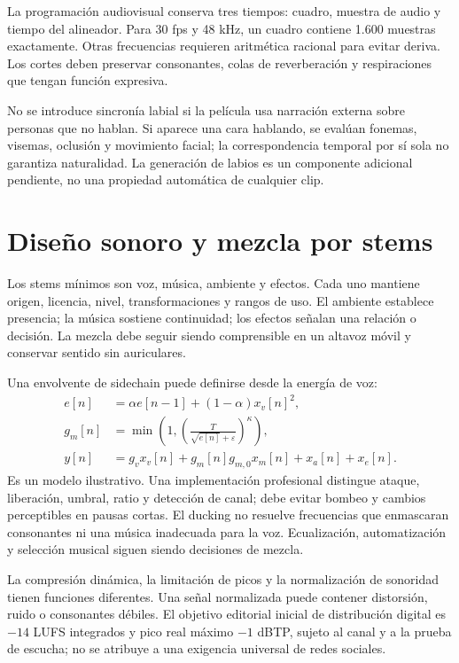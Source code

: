 La programación audiovisual conserva tres tiempos: cuadro, muestra de audio y tiempo del alineador. Para 30 fps y 48 kHz, un cuadro contiene 1.600 muestras exactamente. Otras frecuencias requieren aritmética racional para evitar deriva. Los cortes deben preservar consonantes, colas de reverberación y respiraciones que tengan función expresiva.

No se introduce sincronía labial si la película usa narración externa sobre personas que no hablan. Si aparece una cara hablando, se evalúan fonemas, visemas, oclusión y movimiento facial; la correspondencia temporal por sí sola no garantiza naturalidad. La generación de labios es un componente adicional pendiente, no una propiedad automática de cualquier clip.

\section{Diseño sonoro y mezcla por stems}
Los stems mínimos son voz, música, ambiente y efectos. Cada uno mantiene origen, licencia, nivel, transformaciones y rangos de uso. El ambiente establece presencia; la música sostiene continuidad; los efectos señalan una relación o decisión. La mezcla debe seguir siendo comprensible en un altavoz móvil y conservar sentido sin auriculares.

Una envolvente de sidechain puede definirse desde la energía de voz:
\begin{align}
 e[n]&=\alpha e[n-1]+(1-\alpha)x_v[n]^2,\\
 g_m[n]&=\min\left(1,\left(\frac{T}{\sqrt{e[n]}+\varepsilon}\right)^\kappa\right),\\
 y[n]&=g_vx_v[n]+g_m[n]g_{m,0}x_m[n]+x_a[n]+x_e[n].
\end{align}
Es un modelo ilustrativo. Una implementación profesional distingue ataque, liberación, umbral, ratio y detección de canal; debe evitar bombeo y cambios perceptibles en pausas cortas. El ducking no resuelve frecuencias que enmascaran consonantes ni una música inadecuada para la voz. Ecualización, automatización y selección musical siguen siendo decisiones de mezcla.

La compresión dinámica, la limitación de picos y la normalización de sonoridad tienen funciones diferentes. Una señal normalizada puede contener distorsión, ruido o consonantes débiles. El objetivo editorial inicial de distribución digital es $-14$ LUFS integrados y pico real máximo $-1$ dBTP, sujeto al canal y a la prueba de escucha; no se atribuye a una exigencia universal de redes sociales.

